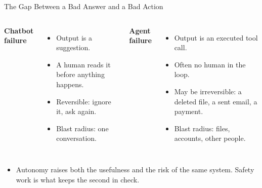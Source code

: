 \begin{frame}{The Gap Between a Bad Answer and a Bad Action}
  \begin{columns}[T,onlytextwidth]
      \textbf{Chatbot failure}
      \begin{itemize}\itemsep0.4em
        \item Output is a suggestion.
        \item A human reads it before anything happens.
        \item Reversible: ignore it, ask again.
        \item Blast radius: one conversation.
      \end{itemize}
      \textbf{Agent failure}
      \begin{itemize}\itemsep0.4em
        \item Output is an executed tool call.
        \item Often no human in the loop.
        \item May be irreversible: a deleted file, a sent email, a payment.
        \item Blast radius: files, accounts, other people.
      \end{itemize}
  \end{columns}
  \vspace{1.2em}
  \begin{itemize}
    \item[\textcolor{KAred}{$\blacktriangleright$}] Autonomy raises both the usefulness and the risk of the same system. Safety work is what keeps the second in check.
  \end{itemize}
\end{frame}

